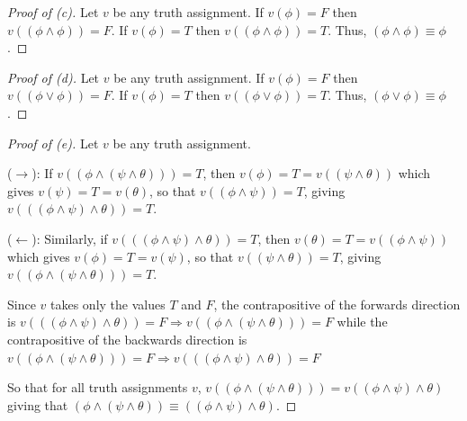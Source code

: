 \documentclass{article}
\theoremstyle{remark}\newtheorem{remark}{Remark}
\theoremstyle{plain}
\begin{document}
\begin{proof}[Proof of (c)]
    Let $v$ be any truth assignment. If $v(\phi) = F$ then $v((\phi \land \phi)) = F$. If $v(\phi) = T$ then $v((\phi \land \phi)) = T$. Thus, $(\phi \land \phi) \equiv \phi$.
\end{proof}

\begin{proof}[Proof of (d)]
    Let $v$ be any truth assignment. If $v(\phi) = F$ then $v((\phi \lor \phi)) = F$. If $v(\phi) = T$ then $v((\phi \lor \phi)) = T$. Thus, $(\phi \lor \phi) \equiv \phi$.
\end{proof}

\begin{proof}[Proof of (e)]
    Let $v$ be any truth assignment.
    
    ($\rightarrow$):
    If $v((\phi \land (\psi \land \theta))) = T$, then $v(\phi) = T = v((\psi \land \theta))$ which gives $v(\psi) = T = v(\theta)$, so that $v((\phi \land \psi)) = T$, giving $v(((\phi \land \psi) \land \theta)) = T$.
    
    ($\leftarrow$):
    Similarly, if $v(((\phi \land \psi) \land \theta)) = T$, then $v(\theta) = T = v((\phi \land \psi))$ which gives $v(\phi) = T = v(\psi)$, so that $v((\psi \land \theta)) = T$, giving $v((\phi \land (\psi \land \theta))) = T$.
    
    Since $v$ takes only the values $T$ and $F$, the contrapositive of the forwards direction is $v(((\phi \land \psi) \land \theta)) = F \Rightarrow v((\phi \land (\psi \land \theta))) = F$ while the contrapositive of the backwards direction is $v((\phi \land (\psi \land \theta))) = F \Rightarrow v(((\phi \land \psi) \land \theta)) = F$
    
    So that for all truth assignments $v$, $v((\phi \land (\psi \land \theta))) = v((\phi \land \psi) \land \theta)$ giving that $(\phi \land (\psi \land \theta)) \equiv ((\phi \land \psi) \land \theta)$.
\end{proof}
\end{document}
